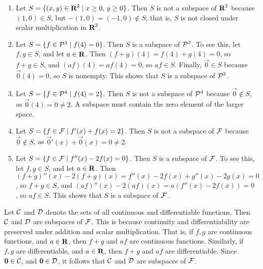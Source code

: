 \documentclass{homework}
\begin{document}
	\maketitle
	
	\question 
	\begin{enumerate}
		\item Let $S = \{(x,y) \in \textnormal{\bf R}^2 \mid x \ge 0,\, y\ge 0\}$. Then $S$ is not a subspace of $\textnormal{\bf R}^2$ because $(1,0) \in S$, but $-(1,0) = (-1,0) \notin S$; that is, $S$ is not closed under scalar multiplication in $\textnormal{\bf R}^2$.
		
		\item Let $S = \{f \in \mathcal{P}^3 \mid f(4) = 0\}$. Then $S$ is a subspace of $\mathcal{P}^3$. To see this, let $f,g\in S$, and let $a \in \textnormal{\bf R}$. Then $(f+g)(4) = f(4) + g(4) = 0$, so $f+g \in S$, and $(af)(4) = af(4) = 0$, so $af \in S$. Finally, $\vec{0} \in S$ because $\vec{0}(4) = 0$, so $S$ is nonempty. This shows that $S$ is a subspace of $\mathcal{P}^3$.
		
		\item Let $S = \{f \in \mathcal{P}^4 \mid f(4) = 2\}$. Then $S$ is not a subspace of $\mathcal{P}^4$ because $\vec{0} \notin S$, as $\vec{0}(4) = 0\ne 2$. A subspace must contain the zero element of the larger space.
		
		\item Let $S = \{f \in \mathcal{F} \mid f'(x) + f(x) = 2\}$. Then $S$ is not a subspace of $\mathcal{F}$ because $\vec{0} \notin S$, as $\vec{0}'(x) + \vec{0}(x) = 0 \ne 2$.
		
		\item Let $S = \{f \in \mathcal{F} \mid f''(x) - 2f(x) = 0\}$. Then $S$ is a subspace of $\mathcal{F}$. To see this, let $f,g\in S$, and let $a \in \textnormal{\bf R}$. Then $(f+g)''(x) -2(f+g)(x) = f''(x) - 2f(x) + g''(x) -2g(x) = 0$, so $f+g \in S$, and $(af)''(x) -2(af)(x) = a(f''(x) - 2f(x)) = 0$, so $af \in S$. This shows that $S$ is a subspace of $\mathcal{F}$.
	\end{enumerate}
	
	\question Let $\mathcal{C}$ and $\mathcal{D}$ denote the sets of all continuous and differentiable functions. Then $\mathcal{C}$ and $\mathcal{D}$ are subspaces of $\mathcal{F}$. This is because continuity and differentiability are preserved under addition and scalar multiplication. That is, if $f,g$ are continuous functions, and $a \in \textnormal{\bf R}$, then $f+g$ and $af$ are continuous functions. Similarly, if $f,g$ are differentiable, and $a \in \textnormal{\bf R}$, then $f+g$ and $af$ are differentiable. Since $\mathbf{0} \in \mathcal{C}$, and $\mathbf{0} \in \mathcal{D}$, it follows that $\mathcal{C}$ and $\mathcal{D}$ are subspaces of $\mathcal{F}$.
	
\end{document}
